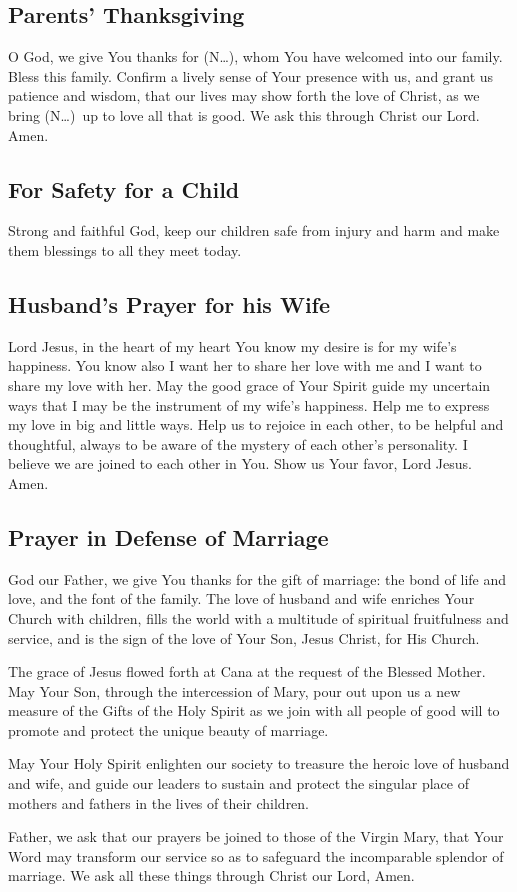 \documentclass[12pt]{article}
\newcommand{\prayertitle}[1]{\subsection{#1}}
\newcommand{\insertname}{(N\dots)}
\begin{document}
\prayertitle{Parents' Thanksgiving}
O God, we give You thanks for \insertname, whom You have welcomed into our family.
Bless this family.
Confirm a lively sense of Your presence with us, and grant us patience and wisdom, that our lives may show forth the love of Christ, as we bring \insertname\ up to love all that is good.
We ask this through Christ our Lord.
Amen.

\prayertitle{For Safety for a Child}
Strong and faithful God, keep our children safe from injury and harm and make them blessings to all they meet today.

\prayertitle{Husband's Prayer for his Wife}
Lord Jesus, in the heart of my heart You know my desire is for my wife's happiness.
You know also I want her to share her love with me and I want to share my love with her.
May the good grace of Your Spirit guide my uncertain ways that I may be the instrument of my wife's happiness.
Help me to express my love in big and little ways.
Help us to rejoice in each other, to be helpful and thoughtful, always to be aware of the mystery of each other's personality.
I believe we are joined to each other in You.
Show us Your favor, Lord Jesus.
Amen.

\prayertitle{Prayer in Defense of Marriage}
God our Father, we give You thanks for the gift of marriage:
the bond of life and love, and the font of the family. 
The love of husband and wife enriches Your Church with children, fills the world with a multitude of spiritual fruitfulness and service,
and is the sign of the love of Your Son, Jesus Christ, for His Church.

The grace of Jesus flowed forth at Cana at the request of the Blessed Mother.
May Your Son, through the intercession of Mary, pour out upon us a new measure of the Gifts of the Holy Spirit as we join with all people of good will to promote and protect the unique beauty of marriage.

May Your Holy Spirit enlighten our society to treasure the heroic love of husband and wife, and guide our leaders to sustain and protect
the singular place of mothers and fathers in the lives of their children.

Father, we ask that our prayers be joined to those of the Virgin Mary, that Your Word may transform our service so as to safeguard the incomparable splendor of marriage.
We ask all these things through Christ our Lord,
Amen.
\end{document}
